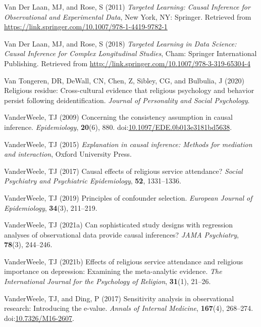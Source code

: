 \documentclass[
  single column]{article}
\newlength{\cslhangindent}
\newenvironment{CSLReferences}[2] %
 {\begin{list}{}{%
  \setlength{\itemindent}{0pt}
  \setlength{\leftmargin}{0pt}
  \setlength{\parsep}{0pt}
  \ifodd #1
   \setlength{\leftmargin}{\cslhangindent}
   \setlength{\itemindent}{-1\cslhangindent}
  \fi
  \setlength{\itemsep}{#2\baselineskip}}}
 {\end{list}}
\begin{document}
\begin{CSLReferences}{1}{0}
Van Der Laan, MJ, and Rose, S (2011) \emph{Targeted Learning: Causal
Inference for Observational and Experimental Data}, New York, NY:
Springer. Retrieved from
\url{https://link.springer.com/10.1007/978-1-4419-9782-1}

Van Der Laan, MJ, and Rose, S (2018) \emph{Targeted Learning in Data
Science: Causal Inference for Complex Longitudinal Studies}, Cham:
Springer International Publishing. Retrieved from
\url{http://link.springer.com/10.1007/978-3-319-65304-4}

Van Tongeren, DR, DeWall, CN, Chen, Z, Sibley, CG, and Bulbulia, J
(2020) Religious residue: Cross-cultural evidence that religious
psychology and behavior persist following deidentification.
\emph{Journal of Personality and Social Psychology}.

VanderWeele, TJ (2009) Concerning the consistency assumption in causal
inference. \emph{Epidemiology}, \textbf{20}(6), 880.
doi:\href{https://doi.org/10.1097/EDE.0b013e3181bd5638}{10.1097/EDE.0b013e3181bd5638}.

VanderWeele, TJ (2015) \emph{Explanation in causal inference: Methods
for mediation and interaction}, Oxford University Press.

VanderWeele, TJ (2017) Causal effects of religious service attendance?
\emph{Social Psychiatry and Psychiatric Epidemiology}, \textbf{52},
1331--1336.

VanderWeele, TJ (2019) Principles of confounder selection.
\emph{European Journal of Epidemiology}, \textbf{34}(3), 211--219.

VanderWeele, TJ (2021a) Can sophisticated study designs with regression
analyses of observational data provide causal inferences? \emph{JAMA
Psychiatry}, \textbf{78}(3), 244--246.

VanderWeele, TJ (2021b) Effects of religious service attendance and
religious importance on depression: Examining the meta-analytic
evidence. \emph{The International Journal for the Psychology of
Religion}, \textbf{31}(1), 21--26.

VanderWeele, TJ, and Ding, P (2017) Sensitivity analysis in
observational research: Introducing the e-value. \emph{Annals of
Internal Medicine}, \textbf{167}(4), 268--274.
doi:\href{https://doi.org/10.7326/M16-2607}{10.7326/M16-2607}.


\end{CSLReferences}
\end{document}
